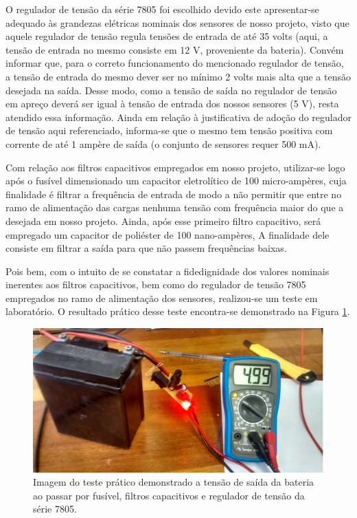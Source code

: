 O regulador de tensão da série 7805 foi escolhido devido este apresentar-se adequado às grandezas elétricas nominais dos sensores de nosso projeto, visto que aquele regulador de tensão regula tensões de entrada de até 35 volts (aqui, a tensão de entrada no mesmo consiste em 12 V, proveniente da bateria). Convém informar que, para o correto funcionamento do mencionado regulador de tensão, a tensão de entrada do mesmo dever ser no mínimo 2 volts mais alta que a tensão desejada na saída. Desse modo, como a tensão de saída no regulador de tensão em apreço deverá ser igual à tensão de entrada dos nossos sensores (5 V), resta atendido essa informação. Ainda em relação à justificativa de adoção do regulador de tensão aqui referenciado, informa-se que o mesmo tem tensão positiva com corrente de até 1 ampère de saída (o conjunto de sensores requer 500 mA).

Com relação aos filtros capacitivos empregados em nosso projeto, utilizar-se logo após o fusível dimensionado um capacitor eletrolítico de 100 micro-ampères, cuja finalidade é filtrar a frequência de entrada de modo a não permitir que entre no ramo de alimentação das cargas nenhuma tensão com frequência maior do que a desejada em nosso projeto. Ainda, após esse primeiro filtro capacitivo, será empregado um capacitor de poliéster de 100 nano-ampères, A finalidade dele consiste em filtrar a saída para que não passem frequências baixas.

Pois bem, com o intuito de se constatar a fidedignidade dos valores nominais inerentes aos filtros capacitivos, bem como do regulador de tensão 7805 empregados no ramo de alimentação dos sensores, realizou-se um teste em laboratório. O resultado prático desse teste encontra-se demonstrado na Figura \ref{teste-pratico}.

\begin{figure}[h]
	\centering
	\includegraphics[scale=0.7]		{figuras/teste_pratico.png}
	\caption{Imagem do teste prático demonstrado a tensão de saída da bateria ao passar por fusível, filtros capacitivos e regulador de tensão da série 7805.}
	\label{teste-pratico}
\end{figure}

